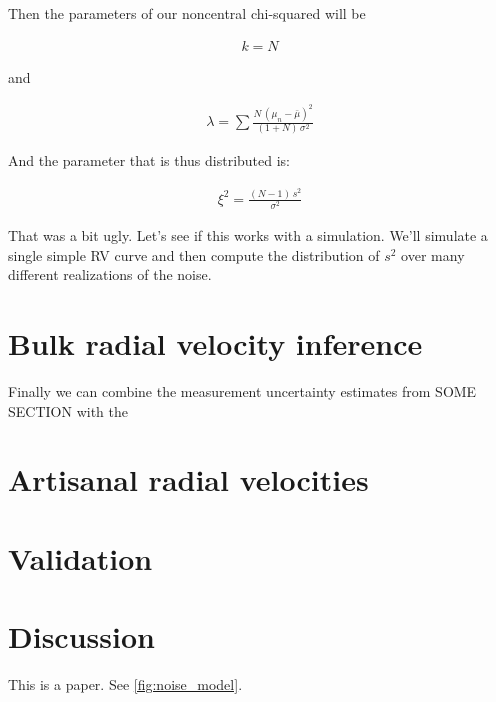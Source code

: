 \documentclass[modern, letterpaper]{aastex631}
\begin{document}
Then the parameters of our noncentral chi-squared will be

\begin{eqnarray}
	k = N
\end{eqnarray}

and

\begin{eqnarray}
	\lambda = \sum \frac{N\,(\mu_n - \bar{\mu})^2}{(1 + N)\,\sigma^2}
\end{eqnarray}

And the parameter that is thus distributed is:

\begin{eqnarray}
	\xi^2 = \frac{(N - 1)\,s^2}{\sigma^2}
\end{eqnarray}

That was a bit ugly.
Let's see if this works with a simulation.
We'll simulate a single simple RV curve and then compute the distribution of $s^2$ over many different realizations of the noise.

\section{Bulk radial velocity inference}

Finally we can combine the measurement uncertainty estimates from SOME SECTION with the

\section{Artisanal radial velocities}

\section{Validation}

\section{Discussion}

This is a paper.
See \autoref{fig:noise_model}.


\end{document}
